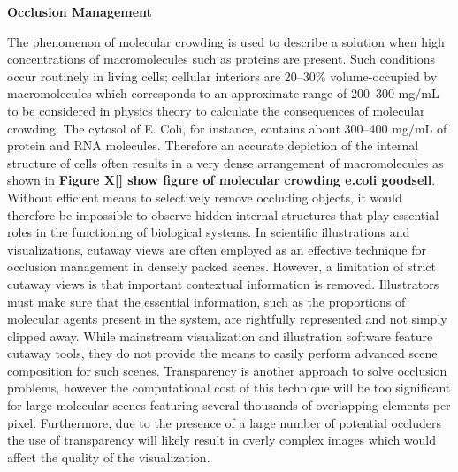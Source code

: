 \textbf{Occlusion Management}

The phenomenon of molecular crowding is used to describe a solution when high concentrations of macromolecules such as proteins are present.
Such conditions occur routinely in living cells; cellular interiors are 20–30\% volume-occupied by macromolecules which corresponds to an approximate range of 200–300 mg/mL to be considered in physics theory to calculate the consequences of molecular crowding.
The cytosol of E. Coli, for instance, contains about 300–400 mg/mL of protein and RNA molecules.
Therefore an accurate depiction of the internal structure of cells often results in a very dense arrangement of macromolecules as shown in \textbf{Figure X[] show figure of molecular crowding e.coli goodsell}.
Without efficient means to selectively remove occluding objects, it would therefore be impossible to observe hidden internal structures that play essential roles in the functioning of biological systems.
In scientific illustrations and visualizations, cutaway views are often employed as an effective technique for occlusion management in densely packed scenes.
However, a limitation of strict cutaway views is that important contextual information is removed.
Illustrators must make sure that the essential information, such as the proportions of molecular agents present in the system, are rightfully represented and not simply clipped away.
While mainstream visualization and illustration software feature cutaway tools, they do not provide the means to easily perform advanced scene composition for such scenes.
Transparency is another approach to solve occlusion problems, however the computational cost of this technique will be too significant for large molecular scenes featuring several thousands of overlapping elements per pixel.
Furthermore, due to the presence of a large number of potential occluders the use of transparency will likely result in overly complex images which would affect the quality of the visualization.

